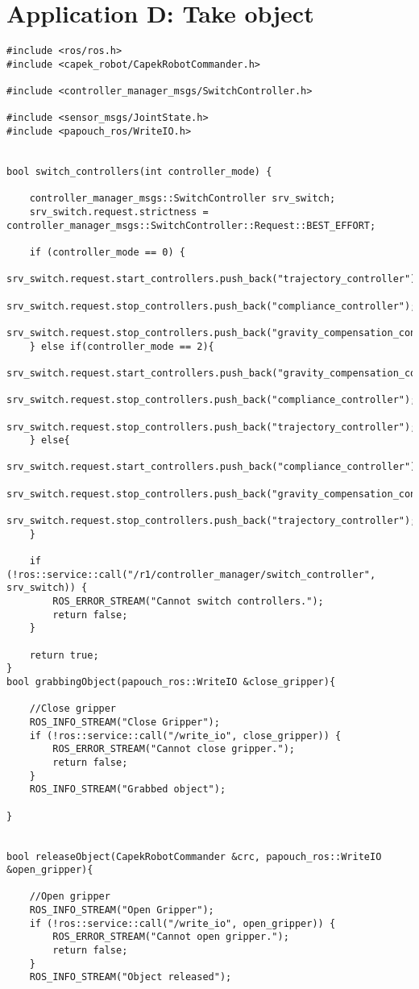 \chapter{Application D: Take object}
\begin{lstlisting}
#include <ros/ros.h>
#include <capek_robot/CapekRobotCommander.h>

#include <controller_manager_msgs/SwitchController.h>

#include <sensor_msgs/JointState.h>
#include <papouch_ros/WriteIO.h>


bool switch_controllers(int controller_mode) {

    controller_manager_msgs::SwitchController srv_switch;
    srv_switch.request.strictness = controller_manager_msgs::SwitchController::Request::BEST_EFFORT;

    if (controller_mode == 0) {
        srv_switch.request.start_controllers.push_back("trajectory_controller");
        srv_switch.request.stop_controllers.push_back("compliance_controller");
        srv_switch.request.stop_controllers.push_back("gravity_compensation_controller");
    } else if(controller_mode == 2){
        srv_switch.request.start_controllers.push_back("gravity_compensation_controller");
        srv_switch.request.stop_controllers.push_back("compliance_controller");
        srv_switch.request.stop_controllers.push_back("trajectory_controller");
    } else{
        srv_switch.request.start_controllers.push_back("compliance_controller");
        srv_switch.request.stop_controllers.push_back("gravity_compensation_controller");
        srv_switch.request.stop_controllers.push_back("trajectory_controller");
    }

    if (!ros::service::call("/r1/controller_manager/switch_controller", srv_switch)) {
        ROS_ERROR_STREAM("Cannot switch controllers.");
        return false;
    }

    return true;
}
bool grabbingObject(papouch_ros::WriteIO &close_gripper){

	//Close gripper
	ROS_INFO_STREAM("Close Gripper");
	if (!ros::service::call("/write_io", close_gripper)) {
		ROS_ERROR_STREAM("Cannot close gripper.");
		return false;
	}
	ROS_INFO_STREAM("Grabbed object");

}


bool releaseObject(CapekRobotCommander &crc, papouch_ros::WriteIO &open_gripper){
	
	//Open gripper
	ROS_INFO_STREAM("Open Gripper");
	if (!ros::service::call("/write_io", open_gripper)) {
		ROS_ERROR_STREAM("Cannot open gripper.");
		return false;
	}
	ROS_INFO_STREAM("Object released");


\end{lstlisting}
